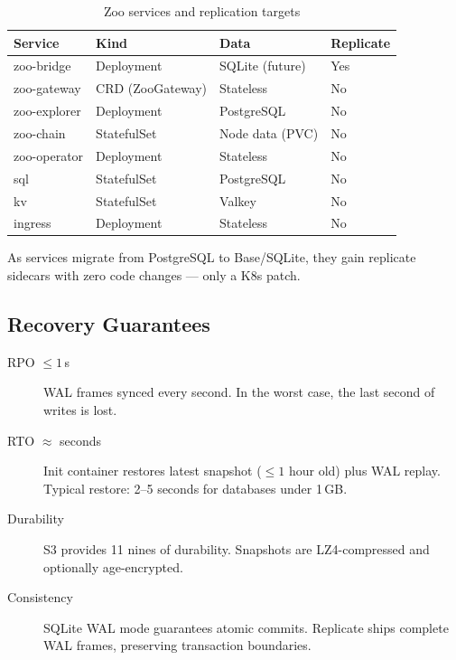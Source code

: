 \documentclass[twocolumn,11pt]{article}
\begin{document}
\begin{table}[h]
\centering
\caption{Zoo services and replication targets}
\begin{tabular}{@{}llll@{}}
\toprule
Service & Kind & Data & Replicate \\
\midrule
zoo-bridge & Deployment & SQLite (future) & Yes \\
zoo-gateway & CRD (ZooGateway) & Stateless & No \\
zoo-explorer & Deployment & PostgreSQL & No \\
zoo-chain & StatefulSet & Node data (PVC) & No\footnotemark \\
zoo-operator & Deployment & Stateless & No \\
sql & StatefulSet & PostgreSQL & No \\
kv & StatefulSet & Valkey & No \\
ingress & Deployment & Stateless & No \\
\bottomrule
\end{tabular}
\end{table}

As services migrate from PostgreSQL to Base/SQLite, they gain
replicate sidecars with zero code changes --- only a K8s patch.

\subsection{Recovery Guarantees}

\begin{description}
\item[RPO $\leq 1$\,s] WAL frames synced every second.
  In the worst case, the last second of writes is lost.

\item[RTO $\approx$ seconds] Init container restores latest
  snapshot ($\leq 1$ hour old) plus WAL replay.  Typical
  restore: 2--5 seconds for databases under 1\,GB.

\item[Durability] S3 provides 11 nines of durability.
  Snapshots are LZ4-compressed and optionally age-encrypted.

\item[Consistency] SQLite WAL mode guarantees atomic commits.
  Replicate ships complete WAL frames, preserving transaction
  boundaries.
\end{description}
\end{document}
